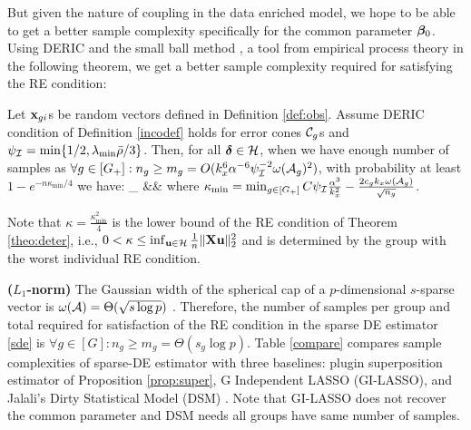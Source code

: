 But given the nature of coupling in the data enriched model, we hope to be able to get a better sample complexity specifically for the common parameter $\boldsymbol{\beta}_0$.
Using DERIC and the small ball method \cite{mend15}, a tool from empirical process theory in the following theorem, we get a better sample complexity required for satisfying the RE condition:
\begin{theorem}
	\label{theo:re}
	Let $\mathbf{x}_{gi}$s	be random vectors defined in Definition \ref{def:obs}.
	Assume DERIC condition of Definition \ref{incodef} holds for error cones $\cC_g$s and $\rinc=\min\{1/2, \lamin\ratio/3\}$.
	Then, for all $\ddelta \in \cH$, when we have enough number of samples as $\forall g \in [G_+]: n_g \geq m_g = O(k_x^6 \alpha^{-6} \rinc^{-2} \omega(\cA_g)^2)$, with probability at least $1 - e^{-n \kappa_{\min}/4}$  we have:
	\be
	\nr
	\inf_{\ddelta \in \cH}   &\geq& 
	\ee
	where $\kappa_{\min} = \min_{g\in [G_+]} C \rinc \frac{\alpha^3}{k_x^2}  - \frac{2 c_g k_x \omega(\cA_g)}{\sqrt{n_g}}$. 
\end{theorem}

\begin{remark}
	Note that $\kappa = \frac{\kappa_{\min}^2}{4}$ is the lower bound of the RE condition of Theorem \ref{theo:deter}, i.e., $0 < \kappa \leq \inf_{\u \in \cH} \frac{1}{n} \norm{\X \u}{2}^2$ and is determined by the group with the worst individual RE condition. 
\end{remark}

\begin{example}
	{\bf ($L_1$-norm)} The Gaussian width of the spherical cap of a $p$-dimensional $s$-sparse vector is $\omega(\cA) = \Theta(\sqrt{s\log p})$ \cite{banerjee14, vershynin2018high}. Therefore, the number of samples per group and total required for satisfaction of the RE condition in the sparse DE estimator \eqref{sde} is $\forall g \in [G]: n_g \geq m_g = \Theta(s_g \log p)$. 
	Table \ref{compare} compares sample complexities of sparse-DE estimator with three baselines: plugin superposition estimator of Proposition \ref{prop:super}, G Independent LASSO (GI-LASSO), and Jalali's Dirty Statistical Model (DSM) \cite{jrsr10}. Note that GI-LASSO does not recover the common parameter and DSM needs all groups have same number of samples. 
\end{example}

